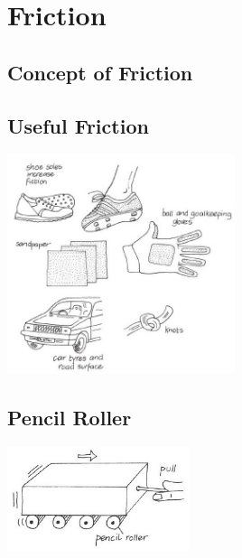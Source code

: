 \section{Friction}

\begin{multicols}{2}


\section*{Concept of Friction}


\subsection{Useful Friction}

\begin{center}
\includegraphics[width=0.5\textwidth]{./img/vso/useful-friction.jpg}
\end{center}

\subsection{Pencil Roller}

\begin{center}
\includegraphics[width=0.4\textwidth]{./img/vso/pencil-roller.jpg}
\end{center}


\end{multicols}
